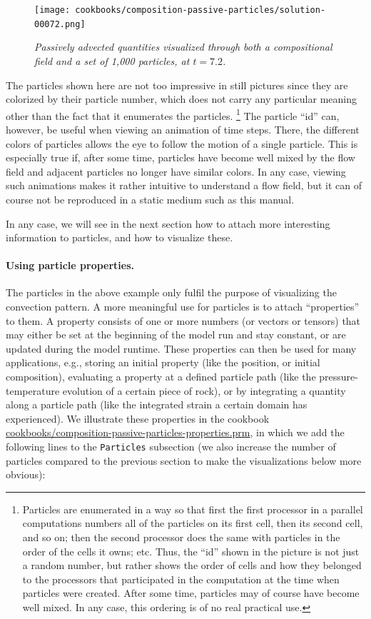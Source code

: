 \documentclass{article}
\begin{document}
\begin{figure}
  \centering
  \texttt{[image: cookbooks/composition-passive-particles/solution-00072.png]}
  \caption{\it Passively advected quantities visualized through both a
  compositional field and a set of 1,000 particles, at $t=7.2$.}
  \label{fig:composition-passive-particles}
\end{figure}

The particles shown here are not too impressive in still pictures since they are
colorized by their particle number, which does not carry any particular meaning
other than the fact that it enumerates the particles.%
\footnote{Particles are enumerated in a way so that first the first processor
in a parallel computations numbers all of the particles on its first cell, then
its second cell, and so on; then the second processor does the same with
particles in the order of the cells it owns; etc. Thus, the ``id'' shown in the
picture is not just a random number, but rather shows the order of cells and
how they belonged to the processors that participated in the computation at the
time when particles were created. After some time, particles may of course have
become well mixed. In any case, this ordering is of no real practical use.} 
The particle ``id'' can, however, be useful when viewing an animation of time steps.
There, the different colors of particles allows the eye to follow the motion of
a single particle. This is especially true if, after some time, particles have
become well mixed by the flow field and adjacent particles no longer have
similar colors. In any case, viewing such animations makes it rather intuitive
to understand a flow field, but it can of course not be reproduced in a static medium such as this manual.

In any case, we will see in the next section how to attach more interesting
information to particles, and how to visualize these.


\paragraph{Using particle properties.}

The particles in the above example only fulfil the purpose of
visualizing the convection pattern. A more meaningful use for
particles is to attach ``properties'' to them. A property consists of
one or more numbers (or vectors or tensors) that may either be set at
the beginning of the model run and stay constant, or are updated
during the model runtime. These properties can then be used for many
applications, e.g., storing an initial property (like the position, or
initial composition), evaluating a property at a defined particle path (like the
pressure-temperature evolution of a certain piece of rock), or by integrating a
quantity along a particle path (like the integrated strain a certain domain has
experienced).  We illustrate these properties in the cookbook
\url{cookbooks/composition-passive-particles-properties.prm}, in which we add the
following lines to the \texttt{Particles} subsection (we also increase the number
of particles compared to the previous section to make the visualizations below
more obvious):
\end{document}
